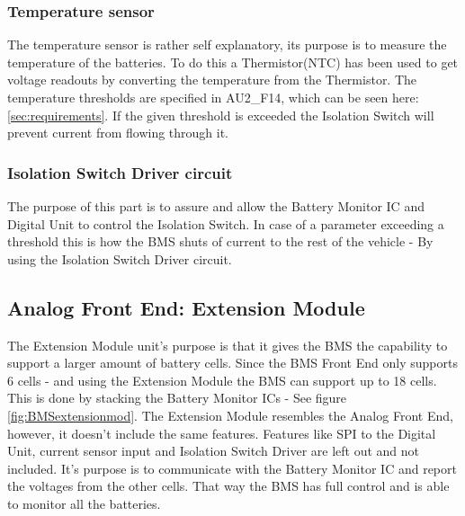 \subsubsection{Temperature sensor}
The temperature sensor is rather self explanatory, its purpose is to measure the temperature of the batteries. To do this a Thermistor(NTC) has been used to get voltage readouts by converting the temperature from the Thermistor. The temperature thresholds are specified in AU2\_F14, which can be seen here: \ref{sec:requirements}. If the given threshold is exceeded the Isolation Switch will prevent current from flowing through it.

\subsubsection{Isolation Switch Driver circuit}
The purpose of this part is to assure and allow the Battery Monitor IC and Digital Unit to control the Isolation Switch. In case of a parameter exceeding a threshold this is how the BMS shuts of current to the rest of the vehicle - By using the Isolation Switch Driver circuit.

\subsection{Analog Front End: Extension Module}
The Extension Module unit's purpose is that it gives the BMS the capability to support a larger amount of battery cells. Since the BMS Front End only supports 6 cells - and using the Extension Module the BMS can support up to 18 cells. This is done by stacking the Battery Monitor ICs - See figure \ref{fig:BMSextensionmod}. The Extension Module resembles the Analog Front End, however, it doesn't include the same features. Features like SPI to the Digital Unit, current sensor input and Isolation Switch Driver are left out and not included. It's purpose is to communicate with the Battery Monitor IC and report the voltages from the other cells. That way the BMS has full control and is able to monitor all the batteries.\\

